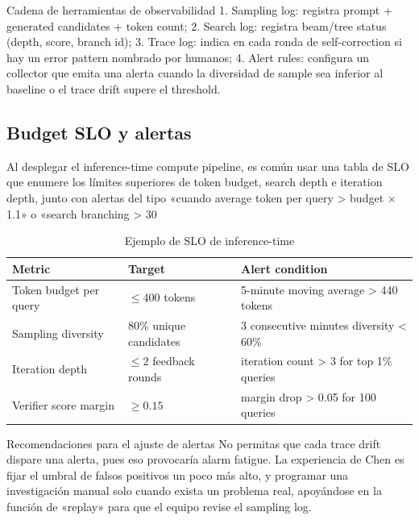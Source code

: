 \documentclass[a4paper]{article}
\begin{document}
\begin{knowledgebox}{Cadena de herramientas de observabilidad}
1. Sampling log: registra prompt + generated candidates + token count; 2. Search log: registra beam/tree status (depth, score, branch id); 3. Trace log: indica en cada ronda de self-correction si hay un error pattern nombrado por humanos; 4. Alert rules: configura un collector que emita una alerta cuando la diversidad de sample sea inferior al baseline o el trace drift supere el threshold.
\end{knowledgebox}

\subsection{Budget SLO y alertas}
Al desplegar el inference-time compute pipeline, es común usar una tabla de SLO que enumere los límites superiores de token budget, search depth e iteration depth, junto con alertas del tipo «cuando average token per query > budget × 1.1» o «search branching > 30%

\begin{table}[H]
\centering
\caption{Ejemplo de SLO de inference-time}
\begin{tabular}{p{}p{}p{}}
\toprule
Metric & Target & Alert condition \\
\midrule
Token budget per query & $\leq 400$ tokens & 5-minute moving average > 440 tokens \\
Sampling diversity & 80\% unique candidates & 3 consecutive minutes diversity < 60\% \\
Iteration depth & $\leq 2$ feedback rounds & iteration count > 3 for top 1\% queries \\
Verifier score margin & $\geq 0.15$ & margin drop > 0.05 for 100 queries \\
\bottomrule
\end{tabular}
\end{table}

\begin{warningbox}{Recomendaciones para el ajuste de alertas}
No permitas que cada trace drift dispare una alerta, pues eso provocaría alarm fatigue. La experiencia de Chen es fijar el umbral de falsos positivos un poco más alto, y programar una investigación manual solo cuando exista un problema real, apoyándose en la función de «replay» para que el equipo revise el sampling log.
\end{warningbox}
\end{document}
